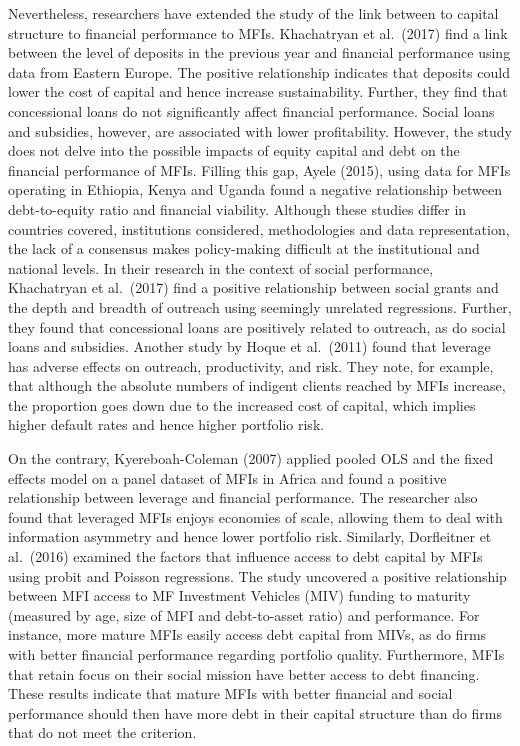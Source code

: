 \documentclass[a4paper, nobind]{templates/ociamthesis}
\begin{document}
Nevertheless, researchers have extended the study of the link between to capital structure to financial performance to MFIs. Khachatryan et al.~(2017) find a link between the level of deposits in the previous year and financial performance using data from Eastern Europe. The positive relationship indicates that deposits could lower the cost of capital and hence increase sustainability. Further, they find that concessional loans do not significantly affect financial performance. Social loans and subsidies, however, are associated with lower profitability. However, the study does not delve into the possible impacts of equity capital and debt on the financial performance of MFIs. Filling this gap, Ayele (2015), using data for MFIs operating in Ethiopia, Kenya and Uganda found a negative relationship between debt-to-equity ratio and financial viability. Although these studies differ in countries covered, institutions considered, methodologies and data representation, the lack of a consensus makes policy-making difficult at the institutional and national levels.
In their research in the context of social performance, Khachatryan et al.~(2017) find a positive relationship between social grants and the depth and breadth of outreach using seemingly unrelated regressions. Further, they found that concessional loans are positively related to outreach, as do social loans and subsidies. Another study by Hoque et al.~(2011) found that leverage has adverse effects on outreach, productivity, and risk. They note, for example, that although the absolute numbers of indigent clients reached by MFIs increase, the proportion goes down due to the increased cost of capital, which implies higher default rates and hence higher portfolio risk.

On the contrary, Kyereboah-Coleman (2007) applied pooled OLS and the fixed effects model on a panel dataset of MFIs in Africa and found a positive relationship between leverage and financial performance. The researcher also found that leveraged MFIs enjoys economies of scale, allowing them to deal with information asymmetry and hence lower portfolio risk. Similarly, Dorfleitner et al.~(2016) examined the factors that influence access to debt capital by MFIs using probit and Poisson regressions. The study uncovered a positive relationship between MFI access to MF Investment Vehicles (MIV) funding to maturity (measured by age, size of MFI and debt-to-asset ratio) and performance. For instance, more mature MFIs easily access debt capital from MIVs, as do firms with better financial performance regarding portfolio quality. Furthermore, MFIs that retain focus on their social mission have better access to debt financing. These results indicate that mature MFIs with better financial and social performance should then have more debt in their capital structure than do firms that do not meet the criterion.
\end{document}
